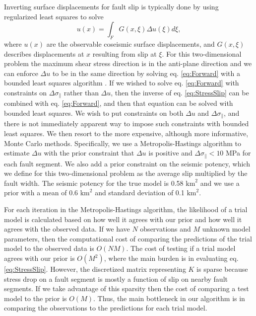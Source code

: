 \documentclass[12pt]{article}
\begin{document}
Inverting surface displacements for fault slip is typically done by using regularized least squares to solve
\begin{equation}\label{eq:Forward}
  u(x) = \int_F G(x,\xi) \Delta u(\xi) d\xi,
\end{equation}
where $u(x)$ are the observable coseismic surface displacements, and $G(x,\xi)$ describes displacements at $x$ resulting from slip at $\xi$.  For this two-dimensional problem the maximum shear stress direction is in the anti-plane direction and we can enforce $\Delta u$ to be in the same direction by solving eq. \ref{eq:Forward} with a bounded least squares algorithm \citep{Lawson1995}.  If we wished to solve eq. \ref{eq:Forward} with constraints on $\Delta \sigma_\parallel$ rather than $\Delta u$, then the inverse of eq. \ref{eq:StressSlip} can be combined with eq. \ref{eq:Forward}, and then that equation can be solved with bounded least squares. We wish to put constraints on both $\Delta u$ and $\Delta \sigma_\parallel$, and there is not immediately apparent way to impose such constraints with bounded least squares.  We then resort to the more expensive, although more informative, Monte Carlo methods.  Specifically, we use a Metropolis-Hastings algorithm to estimate $\Delta u$ with the prior constraint that $\Delta u$ is positive and $\Delta \sigma_\parallel < 10$ MPa for each fault segment.  We also add a prior constraint on the seismic potency, which we define for this two-dimensional problem as the average slip multiplied by the fault width.  The seismic potency for the true model is 0.58 $\mathrm{km}^2$ and we use a prior with a mean of  0.6 $\mathrm{km}^2$ and standard deviation of 0.1 $\mathrm{km}^2$.  

For each iteration in the Metropolis-Hastings algorithm, the likelihood of a trial model is calculated based on how well it agrees with our prior and how well it agrees with the observed data.  If we have $N$ observations and $M$ unknown model parameters, then the computational cost of comparing the predictions of the trial model to the observed data is $O(NM)$. The cost of testing if a trial model agrees with our prior is $O(M^2)$, where the main burden is in evaluating eq. \ref{eq:StressSlip}.  However, the discretized matrix representing $K$ is sparse because stress drop on a fault segment is mostly a function of slip on nearby fault segments.  If we take advantage of this sparsity then the cost of comparing a test model to the prior is $O(M)$.  Thus, the main bottleneck in our algorithm is in comparing the observations to the predictions for each trial model. 
\end{document}
